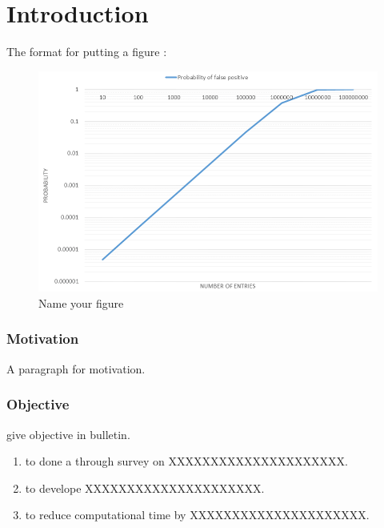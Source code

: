 \fancyhead[RE]{\fontsize{8}{12}\selectfont\leftmark}

\chapter{Introduction}
\label{intro}

The format for putting a figure :

\begin{figure}[ht]
\centering
\includegraphics[scale=0.5]{Images/chart.png}
\caption{Name your figure}
\label{chart}
\end{figure}

\subsection{Motivation}

A paragraph for motivation.

\subsection{Objective}

give objective in bulletin.

\begin{enumerate}[i]
\item  to done a through survey on XXXXXXXXXXXXXXXXXXXXX.
\item to develope XXXXXXXXXXXXXXXXXXXXX.
\item to reduce computational time by XXXXXXXXXXXXXXXXXXXXX.
\end{enumerate}



\cite{Oldham:74}\cite{Monje:10}\cite{Miller:93}\cite{Shantanu:11,podlunbybook:90}
	